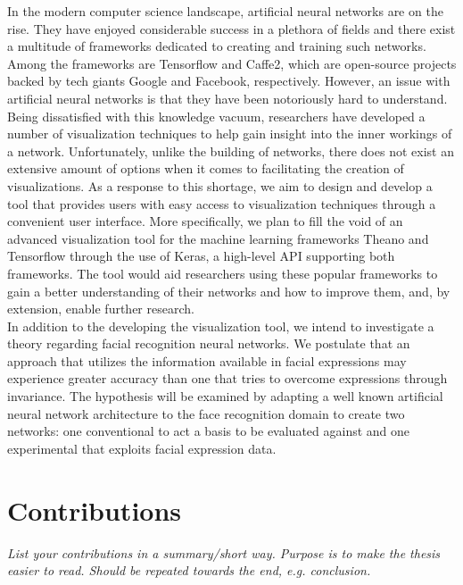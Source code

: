 In the modern computer science landscape, artificial neural networks are on the rise. They have enjoyed considerable success in a plethora of fields and there exist a multitude of frameworks dedicated to creating and training such networks. Among the frameworks are Tensorflow and Caffe2, which are open-source projects backed by tech giants Google and Facebook, respectively. However, an issue with artificial neural networks is that they have been notoriously hard to understand. Being dissatisfied with this knowledge vacuum, researchers have developed a number of visualization techniques to help gain insight into the inner workings of a network. Unfortunately, unlike the building of networks, there does not exist an extensive amount of options when it comes to facilitating the creation of visualizations. As a response to this shortage, we aim to design and develop a tool that provides users with easy access to visualization techniques through a convenient user interface. More specifically, we plan to fill the void of an advanced visualization tool for the machine learning frameworks Theano and Tensorflow through the use of Keras, a high-level API supporting both frameworks. The tool would aid researchers using these popular frameworks to gain a better understanding of their networks and how to improve them, and, by extension, enable further research. \\

\noindent In addition to the developing the visualization tool, we intend to investigate a theory regarding facial recognition neural networks. We postulate that an approach that utilizes the information available in facial expressions may experience greater accuracy than one that tries to overcome expressions through invariance. The hypothesis will be examined by adapting a well known artificial neural network architecture to the face recognition domain to create two networks: one conventional to act a basis to be evaluated against and one experimental that exploits facial expression data. \\

\section{Contributions}

\textit{List your contributions in a summary/short way. Purpose is to make the thesis easier to read. Should be repeated towards the end, e.g. conclusion.} \\

